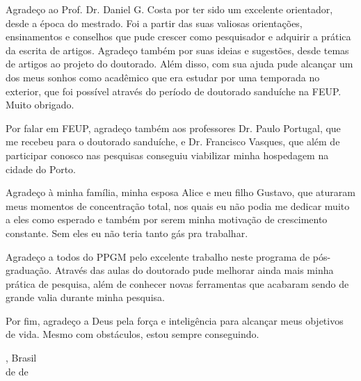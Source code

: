 
\begin{agradecimentos}

Agradeço ao Prof. Dr. Daniel G. Costa por ter sido um excelente orientador, desde a época do mestrado. Foi a partir das suas valiosas orientações, ensinamentos e conselhos que pude crescer como pesquisador e adquirir a prática da escrita de artigos. Agradeço também por suas ideias e sugestões, desde temas de artigos ao projeto do doutorado. Além disso, com sua ajuda pude alcançar um dos meus sonhos como acadêmico que era estudar por uma temporada no exterior, que foi possível através do período de doutorado sanduíche na FEUP. Muito obrigado.

Por falar em FEUP, agradeço também aos professores Dr. Paulo Portugal, que me recebeu para o doutorado sanduíche, e Dr. Francisco Vasques, que além de participar conosco nas pesquisas conseguiu viabilizar minha hospedagem na cidade do Porto.

Agradeço à minha família, minha esposa Alice e meu filho Gustavo, que aturaram meus momentos de concentração total, nos quais eu não podia me dedicar muito a eles como esperado e também por serem minha motivação de crescimento constante. Sem eles eu não teria tanto gás pra trabalhar.

Agradeço a todos do PPGM pelo excelente trabalho neste programa de pós-graduação. Através das aulas do doutorado pude melhorar ainda mais minha prática de pesquisa, além de conhecer novas ferramentas que acabaram sendo de grande valia durante minha pesquisa.

Por fim, agradeço a Deus pela força e inteligência para alcançar meus objetivos de vida. Mesmo com obstáculos, estou sempre conseguindo.

\vspace{2cm}

\noindent
\ppgmcidade, Brasil \hfill \theauthor\\
\ppgmdia\space de \ppgmmes\space de \ppgmano
\end{agradecimentos}

